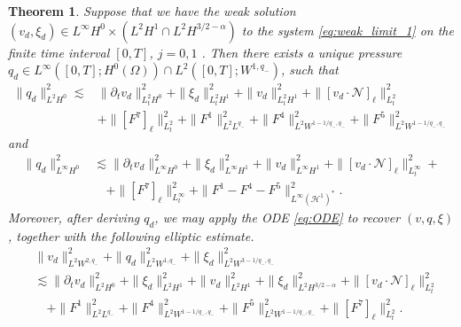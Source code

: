 \documentclass[letterpaper,reqno,10pt,twoside]{amsart}
\newtheorem{theorem}{Theorem}[section]
\theoremstyle{definition}
\theoremstyle{remark}
\def\p{\partial}
\def\Om{\Omega}
\begin{document}
	\begin{theorem}\label{thm:pressure}
		Suppose that we have the weak solution $( v_{d},  \xi_{d}) \in L^\infty H^0 \times \left( L^2 H^1 \cap L^2H^{3/2-\alpha} \right)$ to the system \eqref{eq:weak_limit_1} on the finite time interval $[0, T]$, $j=0, 1$ .  Then there exists a unique pressure $q_{d} \in L^\infty ([0, T]; H^0(\Om)) \cap L^2 ([0, T]; W^{1, q_-})$, such that
		\begin{equation}\label{est:avg_q1}
			\begin{aligned}
				\|q_{d}\|_{L^2 H^0}^2 \lesssim&\|\p_tv_{d}\|_{L_{t}^2H^0}^2  +\|\xi_{d}\|_{L_{t}^2 H^1}^2 + \|v_{d}\|_{L_{t}^2H^1}^2 + \|[v_{d}\cdot \mathcal{N}]_\ell\|_{L^2_t}^2\\
				&+\|[F^7]_\ell\|_{L^2_t}^2 + \|F^1\|_{L^2L^{q_-}}^2 + \|F^4\|_{L^2W^{1-1/q_-,q_-}}^2 + \|F^5\|_{L^2W^{1-1/q_-,q_-}}^2
			\end{aligned}
		\end{equation}
		and
		\begin{equation}\label{est:avg_q2}
			\begin{aligned}
				\|q_{d}\|_{L^\infty H^0}^2
				&\lesssim\|\p_tv_{d}\|_{L^\infty H^0}^2 +\|\xi_{d}\|_{L^\infty H^1}^2 + \|v_{d}\|_{L^\infty H^1}^2 +\|[v_{d}\cdot \mathcal{N}]_\ell\|_{L^\infty_t}^2+\\
				&\quad+\|[F^7]_\ell\|_{L^\infty_t}^2 + \|F^1-F^4-F^5\|_{L^\infty (\mathcal{H}^1)^\ast}^2.
			\end{aligned}
		\end{equation}
		\noindent Moreover, after deriving $q_{d}$, we may apply the ODE \eqref{eq:ODE} to recover $(v,q,\xi)$, together with the following elliptic estimate.
		\begin{equation}\label{est:diss_1}
			\begin{aligned}
				&\| v_{d}\|_{L^2W^{2,q_-}}^2 + \|q_{d}\|_{L^2W^{1,q_-}}^2 + \|\xi_{d}\|_{L^2W^{3-1/q_-,q_-}}^2 \\
				&\lesssim  \|\p_tv_{d}\|_{L^2H^0}^2 +\|\xi_{d} \|_{L^2H^1}^2 + \|v_{d}\|_{L^2H^1}^2 + \|\xi_{d}\|_{L^2H^{3/2-\alpha}}^2 + \|[v_{d}\cdot \mathcal{N}]_\ell\|_{L^2_t}^2\\
				&\quad + \|F^1\|_{L^2L^{q_-}}^2 + \|F^4\|_{L^2W^{1-1/q_-,q_-}}^2 + \|F^5\|_{L^2W^{1-1/q_-,q_-}}^2 + \|[F^7]_\ell\|_{L_t^{2}}^2.
			\end{aligned}
		\end{equation}
	\end{theorem}
\end{document}
